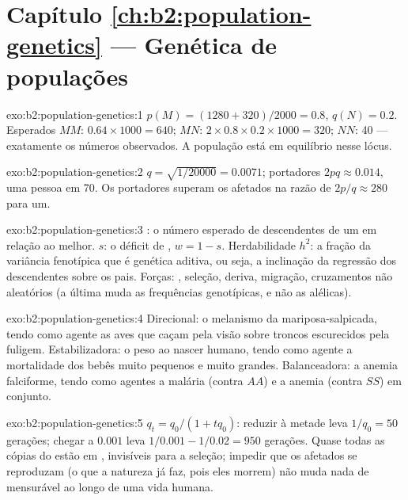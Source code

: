 \section*{Capítulo \ref{ch:b2:population-genetics} --- Genética de populações}

\begin{solution}{exo:b2:population-genetics:1}
$p(M) = (1280 + 320)/2000 = 0.8$, $q(N) = 0.2$. Esperados $MM$:
$0.64\times 1000 = 640$; $MN$: $2\times 0.8\times 0.2\times 1000 =
320$; $NN$: 40 --- exatamente os números observados. A população está
em equilíbrio nesse lócus.
\end{solution}

\begin{solution}{exo:b2:population-genetics:2}
$q = \sqrt{1/20000} = 0.0071$; portadores $2pq \approx 0.014$, uma
pessoa em 70. Os portadores superam os afetados na razão de $2p/q \approx
280$ para um.
\end{solution}

\begin{solution}{exo:b2:population-genetics:3}
: o número esperado de descendentes de um  em relação ao
melhor.  $s$: o déficit de , $w = 1 -
s$. Herdabilidade $h^{2}$: a fração da variância fenotípica que é
genética aditiva, ou seja, a inclinação da regressão dos descendentes
sobre os pais. Forças: , seleção, deriva, migração, cruzamentos
não aleatórios (a última muda as frequências genotípicas, e não as
alélicas).
\end{solution}

\begin{solution}{exo:b2:population-genetics:4}
Direcional: o melanismo da mariposa-salpicada, tendo como agente as
aves que caçam pela visão sobre troncos escurecidos pela fuligem.
Estabilizadora: o peso ao nascer humano, tendo como agente a mortalidade
dos bebês muito pequenos e muito grandes. Balanceadora: a anemia
falciforme, tendo como agentes a malária (contra $AA$) e a anemia (contra
$SS$) em conjunto.
\end{solution}

\begin{solution}{exo:b2:population-genetics:5}
$q_t = q_0/(1 + tq_0)$: reduzir à metade leva $1/q_0 = 50$ gerações;
chegar a $0.001$ leva $1/0.001 - 1/0.02 = 950$ gerações. Quase todas as
cópias do  estão em , invisíveis para a seleção;
impedir que os afetados se reproduzam (o que a natureza já faz, pois eles
morrem) não muda nada de mensurável ao longo de uma vida humana.
\end{solution}

